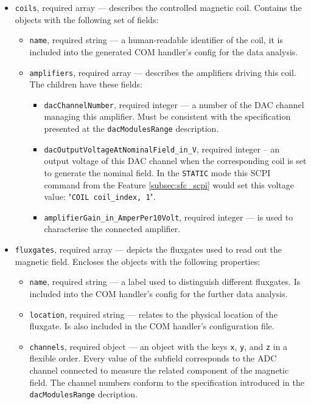 \begin{itemize}
	\item{
		\texttt{coils}, required array --- describes the controlled magnetic coil. Contains the objects with the following set of fields:
		\begin{itemize}
			\item \texttt{name}, required string --- a human-readable identifier of the coil, it is included into the generated COM handler's config for the data analysis.
			\item{
				\texttt{amplifiers}, required array --- describes the amplifiers driving this coil. The children have these fields:
				\begin{itemize}
					\item \texttt{dacChannelNumber}, required integer --- a number of the DAC channel managing this amplifier. Must be consistent with the specification presented at the \texttt{dacModulesRange} description.
					\item \texttt{dacOutputVoltageAtNominalField\_in\_V}, required integer -- an output voltage of this DAC channel when the corresponding coil is set to generate the nominal field. In the \texttt{STATIC} mode this SCPI command from the Feature \ref{subsec:sfc_scpi} would set this voltage value: "\texttt{COIL coil\_index, 1}".
					\item \texttt{amplifierGain\_in\_AmperPer10Volt}, required integer --- is used to characterise the connected amplifier.
				\end{itemize}
			}
		\end{itemize}
	}
	\item{
		\texttt{fluxgates}, required array --- depicts the fluxgates used to read out the magnetic field. Encloses the objects with the following properties:
		\begin{itemize}
			\item \texttt{name}, required string --- a label used to distinguish different fluxgates. Is included into the COM handler's config for the further data analysis.
			\item \texttt{location}, required string --- relates to the physical location of the fluxgate. Is also included in the COM handler's configuration file.
			\item \texttt{channels}, required object --- an object with the keys \texttt{x}, \texttt{y}, and \texttt{z} in a flexible order. Every value of the subfield corresponds to the ADC channel connected to measure the related component of the magnetic field. The channel numbers conform to the specification introduced in the \texttt{dacModulesRange} decription.
		\end{itemize}
	}
\end{itemize}

